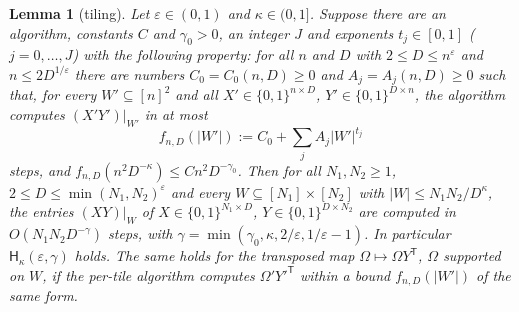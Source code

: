\documentclass[11pt]{article}
\newtheorem{lemma}[theorem]{Lemma}
\theoremstyle{definition}
\theoremstyle{remark}
\providecommand{\eps}{\varepsilon}
\newcommand{\abs}[1]{\lvert #1\rvert}
\newcommand{\Hypk}[1]{\mathsf{H}_{#1}}        %
\begin{document}
\begin{lemma}[tiling]\label{cp:A10:tiling}
Let $\eps\in(0,1)$ and $\kappa\in(0,1]$. Suppose there are an algorithm, constants $C$ and $\gamma_0>0$, an integer $J$ and exponents $t_j\in[0,1]$ ($j=0,\dots,J$) with the following property: for all $n$ and $D$ with $2\le D\le n^\eps$ and $n\le2D^{1/\eps}$ there are numbers $C_0=C_0(n,D)\ge0$ and $A_j=A_j(n,D)\ge0$ such that, for every $W'\subseteq[n]^2$ and all $X'\in\{0,1\}^{n\times D}$, $Y'\in\{0,1\}^{D\times n}$, the algorithm computes $(X'Y')|_{W'}$ in at most
\[
f_{n,D}(\abs{W'}):=C_0+\sum_jA_j\abs{W'}^{t_j}
\]
steps, and $f_{n,D}(n^2D^{-\kappa})\le Cn^2D^{-\gamma_0}$. Then for all $N_1,N_2\ge1$, $2\le D\le\min(N_1,N_2)^\eps$ and every $W\subseteq[N_1]\times[N_2]$ with $\abs W\le N_1N_2/D^\kappa$, the entries $(XY)|_W$ of $X\in\{0,1\}^{N_1\times D}$, $Y\in\{0,1\}^{D\times N_2}$ are computed in $O(N_1N_2D^{-\gamma})$ steps, with $\gamma=\min(\gamma_0,\kappa,2/\eps,1/\eps-1)$. In particular $\Hypk\kappa(\eps,\gamma)$ holds. The same holds for the transposed map $\Omega\mapsto\Omega Y^{\mathsf T}$, $\Omega$ supported on $W$, if the per-tile algorithm computes $\Omega'Y'^{\mathsf T}$ within a bound $f_{n,D}(\abs{W'})$ of the same form.
\end{lemma}
\end{document}
